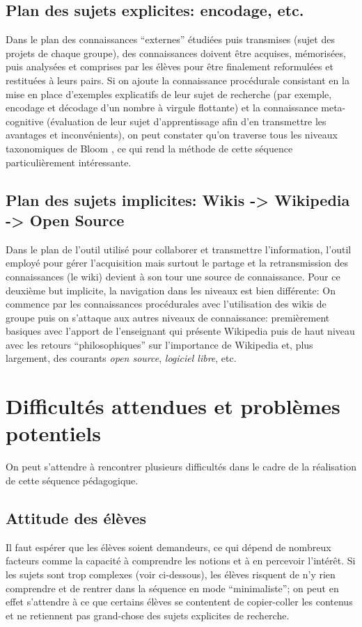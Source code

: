 \documentclass[11pt,bibliography=totoc]{scrartcl}
\begin{document}
\subsection{Plan des sujets explicites: encodage, etc.}
Dans le plan des connaissances ``externes'' étudiées puis transmises (sujet des
projets de chaque groupe), des connaissances doivent être acquises, mémorisées,
puis analysées et comprises par les élèves pour être finalement reformulées et
restituées à leurs pairs. Si on ajoute la connaissance procédurale consistant en
la mise en place d'exemples explicatifs de leur sujet de recherche (par exemple,
encodage et décodage d'un nombre à virgule flottante) et la connaissance
meta-cognitive (évaluation de leur sujet d'apprentissage afin d'en transmettre
les avantages et inconvénients), on peut constater qu'on traverse tous les
niveaux taxonomiques de Bloom \cite{bloom}, ce qui rend la méthode de cette séquence
particulièrement intéressante.

\subsection{Plan des sujets implicites: Wikis -> Wikipedia -> Open Source}
Dans le plan de l'outil utilisé pour collaborer et transmettre l'information,
l'outil employé pour gérer l'acquisition mais surtout le partage et la
retransmission des connaissances (le wiki) devient à son tour une source de
connaissance.  Pour ce deuxième but implicite, la navigation dans les niveaux est
bien différente: On commence par les connaissances procédurales avec
l'utilisation des wikis de groupe puis on s'attaque aux autres niveaux de
connaissance: premièrement basiques avec l'apport de l'enseignant qui présente
Wikipedia puis de haut niveau avec les retours ``philosophiques'' sur
l'importance de Wikipedia et, plus largement, des courants \textit{open source},
\textit{logiciel libre}, etc.

\section{Difficultés attendues et problèmes potentiels}
On peut s'attendre à rencontrer plusieurs difficultés dans le cadre de la
réalisation de cette séquence pédagogique.

\subsection{Attitude des élèves}
Il faut espérer que les élèves soient demandeurs, ce qui dépend de nombreux
facteurs comme la capacité à comprendre les notions et à en percevoir
l'intérêt. Si les sujets sont trop complexes (voir ci-dessous), les élèves
risquent de n'y rien comprendre et de rentrer dans la séquence en mode
``minimaliste''; on peut en effet s'attendre à ce que certains élèves se
contentent de copier-coller les contenus et ne retiennent pas grand-chose des
sujets explicites de recherche.
\end{document}
